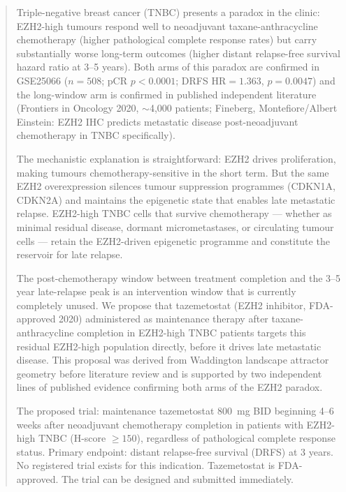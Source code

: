 \documentclass[12pt, a4paper]{article}
\begin{document}
\vspace{0.8em}

\begin{abstract}
\noindent
Triple-negative breast cancer (TNBC) presents a
paradox in the clinic: EZH2-high tumours respond
well to neoadjuvant taxane-anthracycline chemotherapy
(higher pathological complete response rates) but
carry substantially worse long-term outcomes
(higher distant relapse-free survival hazard ratio
at 3--5 years). Both arms of this paradox are
confirmed in GSE25066 ($n=508$; pCR $p<0.0001$;
DRFS HR$=1.363$, $p=0.0047$) and the long-window
arm is confirmed in published independent literature
(Frontiers in Oncology 2020, $\sim$4,000 patients;
Fineberg, Montefiore/Albert Einstein: EZH2 IHC
predicts metastatic disease post-neoadjuvant
chemotherapy in TNBC specifically).

The mechanistic explanation is straightforward:
EZH2 drives proliferation, making tumours
chemotherapy-sensitive in the short term. But the
same EZH2 overexpression silences tumour suppression
programmes (CDKN1A, CDKN2A) and maintains the
epigenetic state that enables late metastatic relapse.
EZH2-high TNBC cells that survive chemotherapy ---
whether as minimal residual disease, dormant
micrometastases, or circulating tumour cells ---
retain the EZH2-driven epigenetic programme and
constitute the reservoir for late relapse.

The post-chemotherapy window between treatment
completion and the 3--5 year late-relapse peak is an
intervention window that is currently completely
unused. We propose that tazemetostat (EZH2 inhibitor,
FDA-approved 2020) administered as maintenance therapy
after taxane-anthracycline completion in EZH2-high
TNBC patients targets this residual EZH2-high
population directly, before it drives late metastatic
disease. This proposal was derived from Waddington
landscape attractor geometry before literature review
and is supported by two independent lines of published
evidence confirming both arms of the EZH2 paradox.

The proposed trial: maintenance tazemetostat
800~mg BID beginning 4--6 weeks after neoadjuvant
chemotherapy completion in patients with EZH2-high
TNBC (H-score $\geq150$), regardless of
pathological complete response status. Primary
endpoint: distant relapse-free survival (DRFS)
at 3 years. No registered trial exists for this
indication. Tazemetostat is FDA-approved.
The trial can be designed and submitted immediately.
\end{abstract}
\end{document}
